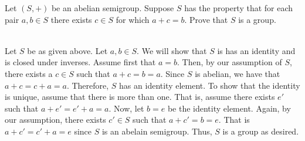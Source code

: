 Let $(S,+)$ be an abelian semigroup. Suppose $S$ has the property that for each pair $a,b\in S$ there
exists $c\in S$ for which $a+c=b$. Prove that $S$ is a group.\\

\begin{solution}\renewcommand{\qedsymbol}{}\ \\
    Let $S$ be as given above. Let $a,b\in S$. We will show that $S$ is has an identity and is closed
    under inverses. Assume first that $a=b$. Then, by our assumption of $S$, there exists a $c\in S$
    such that $a+c=b=a$. Since $S$ is abelian, we have that $a+c=c+a=a$. Therefore, $S$ has an identity
    element. To show that the identity is unique, assume that there is more than one. That is, assume
    there exists $e'$ such that $a+e'=e'+a=a$. Now, let $b=e$ be the identity element. Again, by our
    assumption, there exists $c'\in S$ such that $a+c'=b=e$. That is $a+c'=c'+a=e$ since $S$ is an
    abelain semigroup. Thus, $S$ is a group as desired.
\end{solution}